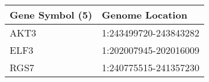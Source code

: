 \begin{tabular}{ll}
\toprule
Gene Symbol (5) &       Genome Location \\
\midrule
           AKT3 & 1:243499720-243843282 \\
           ELF3 & 1:202007945-202016009 \\
           RGS7 & 1:240775515-241357230 \\
\bottomrule
\end{tabular}
